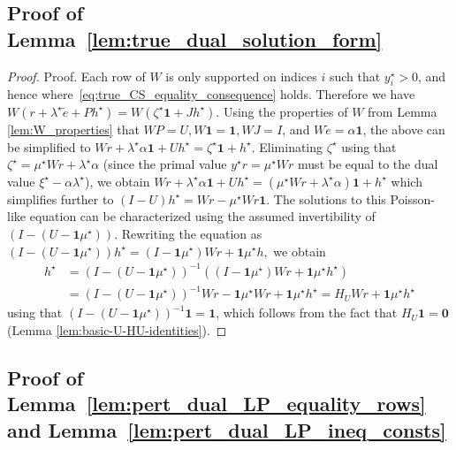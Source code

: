 \documentclass[mnsc,nonblindrev]{informs3}
\newcommand{\one}{\mathbf{1}}
\newcommand{\zero}{\mathbf{0}}
\begin{document}
\begin{APPENDICES}
\subsection{Proof of Lemma~\ref{lem:true_dual_solution_form}}\label{subsec:pr-h-construction}
\label{sec:}
\begin{proof}{Proof.}
    Each row of $W$ is only supported on indices $i$ such that $y^\star_i > 0$, and hence where~\eqref{eq:true_CS_equality_consequence} holds. Therefore we have
    $
        W (r + \lambda^\star \tilde{e} + Ph^\star) = W(\zeta^\star \one + Jh^\star).
    $
    Using the properties of $W$ from Lemma \ref{lem:W_properties} that $WP = U, W \one = \one, W J = I$, and $W \tilde{e} = \alpha \one$, the above can be simplified to
    $
        Wr + \lambda^\star \alpha \one + U h^\star = \zeta^\star \one +  h^\star.
    $
    Eliminating $\zeta^\star$ using that $\zeta^\star = \mu^\star W r + \lambda^\star \alpha$ (since the primal value $y^\star r = \mu^\star W r$ must be equal to the dual value $\xi^\star - \alpha \lambda^\star$), we obtain
    $
        Wr + \lambda^\star \alpha \one + U h^\star = (\mu^\star W r + \lambda^\star \alpha) \one +  h^\star
    $
    which simplifies further to
    $
        (I - U)h^\star = Wr - \mu^\star W r \one.
    $
    The solutions to this Poisson-like equation can be characterized using the assumed invertibility of $(I - (U-\one \mu^\star))$. Rewriting the equation as
    $
        \left(I - (U-\one \mu^\star)\right)h^\star = (I - \one \mu^\star)Wr + \one \mu^\star h,
    $
    we obtain
    \begin{align*}
        h^\star &= \left(I - (U-\one \mu^\star)\right)^{-1}\left( (I - \one \mu^\star)Wr + \one \mu^\star h^\star\right)\\
        &=\left(I - (U-\one \mu^\star)\right)^{-1} Wr - \one \mu^\star Wr + \one \mu^\star h^\star
        = H_U Wr + \one \mu^\star h^\star
    \end{align*}
    using that $\left(I - (U-\one \mu^\star)\right)^{-1} \one = \one$, which follows from the fact that $H_U \one = \zero$ (Lemma \ref{lem:basic-U-HU-identities}).
\end{proof}

\subsection{Proof of Lemma~\ref{lem:pert_dual_LP_equality_rows} and Lemma~\ref{lem:pert_dual_LP_ineq_consts}}\label{subsec:pr-feasibility-dual}


\end{APPENDICES}
\end{document}
